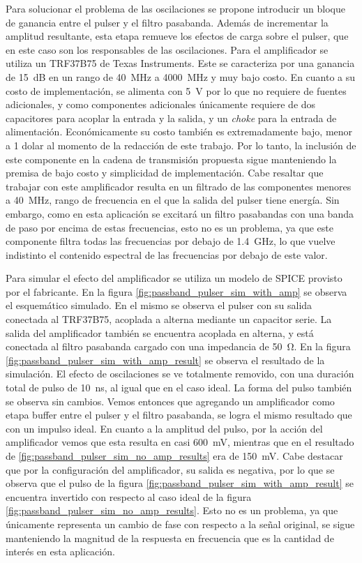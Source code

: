 Para solucionar el problema de las oscilaciones se propone introducir un bloque
de ganancia entre el pulser y el filtro pasabanda. Además de incrementar la
amplitud  resultante, esta etapa remueve los efectos de carga sobre el pulser,
que en este caso son los responsables de las oscilaciones. Para el amplificador
se utiliza un TRF37B75 de Texas Instruments. Este se caracteriza por una
ganancia de \qty{15}{\dB} en un rango de \qty{40}{\mega\hertz} a
\qty{4000}{\mega\hertz} y muy bajo costo. En cuanto a su costo de
implementación, se alimenta con \qty{5}{\volt} por lo que no requiere de fuentes
adicionales, y como componentes adicionales únicamente requiere de dos
capacitores para acoplar la entrada y la salida, y un \textit{choke} para la
entrada de alimentación. Económicamente su costo también es extremadamente bajo,
menor a 1 dolar al momento de la redacción de este trabajo. Por lo tanto, la
inclusión de este componente en la cadena de transmisión propuesta sigue
manteniendo la premisa de bajo costo y simplicidad de implementación. Cabe
resaltar que trabajar con este amplificador resulta en un filtrado de las
componentes menores a \qty{40}{\mega\hertz}, rango de frecuencia en el que la
salida del pulser tiene energía. Sin embargo, como en esta aplicación se
excitará un filtro pasabandas con una banda de paso por encima de estas
frecuencias, esto no es un problema, ya que este componente filtra todas las
frecuencias por debajo de \qty{1.4}{\giga\hertz}, lo que vuelve indistinto el
contenido espectral de las frecuencias por debajo de este valor.

Para simular el efecto del amplificador se utiliza un modelo de SPICE provisto
por el fabricante. En la figura \ref{fig:passband_pulser_sim_with_amp} se
observa el esquemático simulado. En el mismo se observa el pulser con su salida
conectada al TRF37B75, acoplada a alterna mediante un capacitor serie. La salida
del amplificador también se encuentra acoplada en alterna, y está conectada al
filtro pasabanda cargado con una impedancia de \qty{50}{\ohm}. En la figura
\ref{fig:passband_pulser_sim_with_amp_result} se observa el resultado de la
simulación. El efecto de oscilaciones se ve totalmente removido, con una
duración total de pulso de \qty{10}{\nano\second}, al igual que en el caso
ideal. La forma del pulso también se observa sin cambios. Vemos entonces que
agregando un amplificador como etapa buffer entre el pulser y el filtro
pasabanda, se logra el mismo resultado que con un impulso ideal. En cuanto a la
amplitud del pulso, por la acción del amplificador vemos que esta resulta en
casi \qty{600}{\milli\volt}, mientras que en el resultado de
\ref{fig:passband_pulser_sim_no_amp_results} era de \qty{150}{\milli\volt}. Cabe
destacar que por la configuración del amplificador, su salida es negativa, por
lo que se observa que el pulso de la figura
\ref{fig:passband_pulser_sim_with_amp_result} se encuentra invertido con
respecto al caso ideal de la figura
\ref{fig:passband_pulser_sim_no_amp_results}. Esto no es un problema, ya que
únicamente representa un cambio de fase con respecto a la señal original, se
sigue manteniendo la magnitud de la respuesta en frecuencia que es la cantidad
de interés en esta aplicación.

